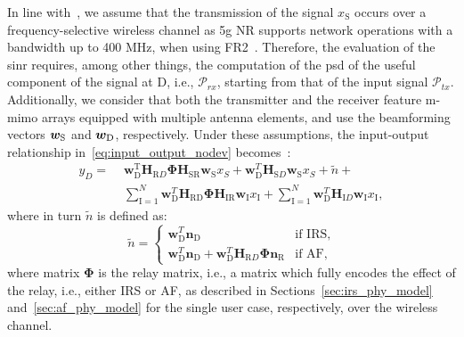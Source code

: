In line with~\cite{zugno2020implementation}, we assume that the transmission of the signal $x_{\mathrm S}$ occurs over a frequency-selective wireless channel as \gls{5g} NR supports network operations with a bandwidth up to 400 MHz, when using FR2~\cite{38101_1}. 
Therefore, the evaluation of the \gls{sinr} requires, among other things, the computation of the \gls{psd} of the useful component of the signal at D, i.e., $\mathcal{P}_{r x}$, starting from that of the input signal $\mathcal{P}_{t x}$. Additionally, we consider that both the transmitter and the receiver feature \gls{m-mimo} arrays equipped with multiple antenna elements, and use the beamforming vectors $\bm{w}_{\textrm S}$ and $\bm{w}_{\textrm D}$, respectively.
Under these assumptions, the input-output relationship in~\eqref{eq:input_output_nodev} becomes~\cite{bjornson2019intelligent, wu2019intelligent}:
\begin{equation}
\label{eq:mimo_input_output_relay}
\begin{aligned}
	y_{D} = \,\, & \bm{w}_{\mathrm D}^{\mathrm T} \bm{H}_{\mathrm RD} \bm{\Phi} \bm{H}_{\mathrm {SR}} \bm{w}_{\mathrm S} x_{S} + \bm{w}_{\mathrm D}^{T} \bm{H}_{\mathrm SD} \bm{w}_{\mathrm S} x_{S} + \tilde{n} + \\
	& \sum_{\mathrm{I}=1}^{N} \bm{w}_{\mathrm D}^{T} \bm{H}_{\mathrm {RD}} \bm{\Phi} \bm{H}_{\mathrm {IR}}  \bm{w}_{\mathrm I} x_{\mathrm I} + \sum_{\mathrm{I}=1}^{N} \bm{w}_{\mathrm D}^{T} \bm{H}_{\mathrm ID}  \bm{w}_{\mathrm I} x_{\mathrm I},
\end{aligned}
\end{equation}
where in turn $\tilde{n}$ is defined as:
\[ 
\tilde{n} = 
\begin{cases}
    \bm{w}_{\mathrm D}^{T} \bm{n}_{\mathrm D}		& \text{if IRS}, \\
    \bm{w}_{\mathrm D}^{T} \bm{n}_{\mathrm D} + \bm{w}_{\mathrm D}^{T} \bm{H}_{\mathrm RD} \bm{\Phi} \bm{n}_{\mathrm R}      & \text{if AF},
\end{cases}
\]
where matrix $\bm{\Phi}$ is the relay matrix, i.e., a matrix which fully encodes the effect of the relay, i.e., either IRS or AF, as described in Sections~\ref{sec:irs_phy_model} and~\ref{sec:af_phy_model} for the single user case, respectively, over the wireless channel. 
